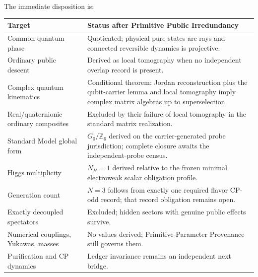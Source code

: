 \begin{remark}
The immediate disposition is:
\begin{center}
\small
\begin{tabularx}{\textwidth}{l Y}
\toprule
Target & Status after Primitive Public Irredundancy \\
\midrule
Common quantum phase
& Quotiented; physical pure states are rays and connected reversible dynamics is projective. \\
Ordinary public descent
& Derived as local tomography when no independent overlap record is present. \\
Complex quantum kinematics
& Conditional theorem: Jordan reconstruction plus the qubit-carrier lemma and local tomography imply complex matrix algebras up to superselection. \\
Real/quaternionic ordinary composites
& Excluded by their failure of local tomography in the standard matrix realization. \\
Standard Model global form
& \(G_0/\mathbb Z_6\) derived on the carrier-generated probe jurisdiction; complete closure awaits the independent-probe census. \\
Higgs multiplicity
& \(N_H=1\) derived relative to the frozen minimal electroweak scalar obligation profile. \\
Generation count
& \(N=3\) follows from exactly one required flavor CP-odd record; that record obligation remains open. \\
Exactly decoupled spectators
& Excluded; hidden sectors with genuine public effects survive. \\
Numerical couplings, Yukawas, masses
& No values derived; Primitive-Parameter Provenance still governs them. \\
Purification and CP dynamics
& Ledger invariance remains an independent next bridge. \\
\bottomrule
\end{tabularx}
\end{center}
\end{remark}

